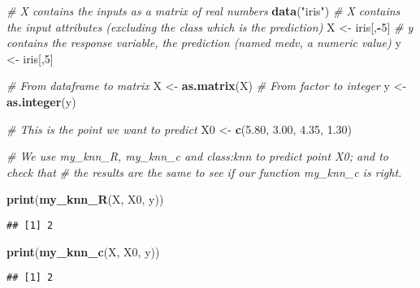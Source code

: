 \documentclass[
]{article}
\newenvironment{Shaded}{\begin{snugshade}}{\end{snugshade}}
\newcommand{\CommentTok}[1]{\textcolor[rgb]{0.56,0.35,0.01}{\textit{#1}}}
\newcommand{\DecValTok}[1]{\textcolor[rgb]{0.00,0.00,0.81}{#1}}
\newcommand{\FloatTok}[1]{\textcolor[rgb]{0.00,0.00,0.81}{#1}}
\newcommand{\FunctionTok}[1]{\textcolor[rgb]{0.13,0.29,0.53}{\textbf{#1}}}
\newcommand{\NormalTok}[1]{#1}
\newcommand{\OtherTok}[1]{\textcolor[rgb]{0.56,0.35,0.01}{#1}}
\newcommand{\SpecialCharTok}[1]{\textcolor[rgb]{0.81,0.36,0.00}{\textbf{#1}}}
\newcommand{\StringTok}[1]{\textcolor[rgb]{0.31,0.60,0.02}{#1}}
\begin{document}
\begin{Shaded}
\begin{Highlighting}[]
\CommentTok{\# X contains the inputs as a matrix of real numbers}
\FunctionTok{data}\NormalTok{(}\StringTok{"iris"}\NormalTok{)}
\CommentTok{\# X contains the input attributes (excluding the class which is the prediction)}
\NormalTok{X }\OtherTok{\textless{}{-}}\NormalTok{ iris[,}\SpecialCharTok{{-}}\DecValTok{5}\NormalTok{]}
\CommentTok{\# y contains the response variable, the prediction (named medv, a numeric value)}
\NormalTok{y }\OtherTok{\textless{}{-}}\NormalTok{ iris[,}\DecValTok{5}\NormalTok{]}

\CommentTok{\# From dataframe to matrix}
\NormalTok{X }\OtherTok{\textless{}{-}} \FunctionTok{as.matrix}\NormalTok{(X)}
\CommentTok{\# From factor to integer}
\NormalTok{y }\OtherTok{\textless{}{-}} \FunctionTok{as.integer}\NormalTok{(y)}

\CommentTok{\# This is the point we want to predict}
\NormalTok{X0 }\OtherTok{\textless{}{-}} \FunctionTok{c}\NormalTok{(}\FloatTok{5.80}\NormalTok{, }\FloatTok{3.00}\NormalTok{, }\FloatTok{4.35}\NormalTok{, }\FloatTok{1.30}\NormalTok{)}
\end{Highlighting}
\end{Shaded}

\begin{Shaded}
\begin{Highlighting}[]
\CommentTok{\# We use my\_knn\_R, my\_knn\_c and class:knn to predict point X0; and to check that}
\CommentTok{\# the results are the same to see if our function \textquotesingle{}my\_knn\_c\textquotesingle{} is right.}

\FunctionTok{print}\NormalTok{(}\FunctionTok{my\_knn\_R}\NormalTok{(X, X0, y))}
\end{Highlighting}
\end{Shaded}

\begin{verbatim}
## [1] 2
\end{verbatim}

\begin{Shaded}
\begin{Highlighting}[]
\FunctionTok{print}\NormalTok{(}\FunctionTok{my\_knn\_c}\NormalTok{(X, X0, y))}
\end{Highlighting}
\end{Shaded}

\begin{verbatim}
## [1] 2
\end{verbatim}
\end{document}
